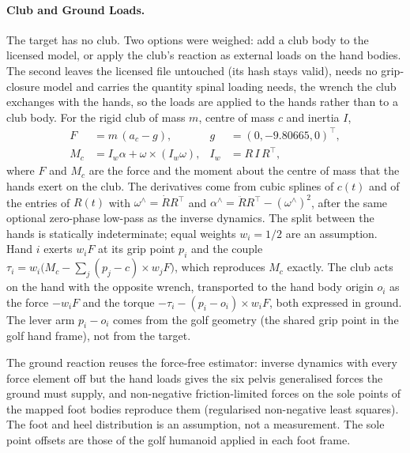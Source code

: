 \paragraph{Club and Ground Loads.}
The target has no club. Two options were weighed: add a club body to the licensed
model, or apply the club's reaction as external loads on the hand bodies. The
second leaves the licensed file untouched (its hash stays valid), needs no
grip-closure model and carries the quantity spinal loading needs, the wrench the
club exchanges with the hands, so the loads are applied to the hands rather than to
a club body. For the rigid club of mass $m$, centre of mass $c$ and inertia $I$,
\begin{align}
  F &= m\,(a_c - g), & g&=(0,-9.80665,0)^{\top},\\
  M_c &= I_w\alpha + \omega\times(I_w\omega), & I_w &= R\,I\,R^{\top},
\end{align}
where $F$ and $M_c$ are the force and the moment about the centre of mass that the
hands exert on the club. The derivatives come from cubic splines of $c(t)$ and of
the entries of $R(t)$ with $\omega^{\wedge}=\dot R R^{\top}$ and
$\alpha^{\wedge}=\ddot R R^{\top}-(\omega^{\wedge})^{2}$, after the same optional
zero-phase low-pass as the inverse dynamics. The split between the hands is
statically indeterminate; equal weights $w_i=1/2$ are an assumption. Hand $i$
exerts $w_iF$ at its grip point $p_i$ and the couple
$\tau_i=w_i\bigl(M_c-\sum_j(p_j-c)\times w_jF\bigr)$, which reproduces $M_c$
exactly. The club acts on the hand with the opposite wrench, transported to the
hand body origin $o_i$ as the force $-w_iF$ and the torque
$-\tau_i-(p_i-o_i)\times w_iF$, both expressed in ground. The lever arm $p_i-o_i$
comes from the golf geometry (the shared grip point in the golf hand frame), not
from the target.

The ground reaction reuses the force-free estimator: inverse dynamics with every
force element off but the hand loads gives the six pelvis generalised forces the
ground must supply, and non-negative friction-limited forces on the sole points of
the mapped foot bodies reproduce them (regularised non-negative least squares).
The foot and heel distribution is an assumption, not a measurement. The sole point
offsets are those of the golf humanoid applied in each foot frame.

